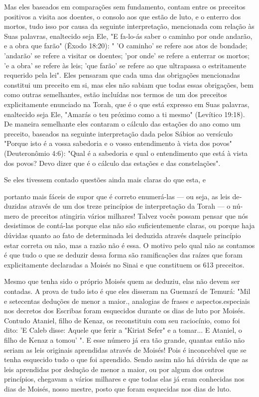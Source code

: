 \begin{itemize}
\begin{enumrate}
Mas eles baseados em comparações sem fundamento, contam entre os
preceitos positivos a visita aos doentes, o consolo aos que estão de
luto, e o enterro dos mortos, tudo isso por causa da seguinte
interpretação, mencio­nada com relação às Suas palavras, enaltecido seja
Ele, "E fa-lo-ás saber o cami­nho por onde andarão, e a obra que farão"
(Êxodo 18:20): " 'O caminho' se refere aos atos de bondade; 'andarão' se
refere a visitar os doentes; 'por onde' se refere a enterrar os mortos;
'e a obra' se refere às leis; 'que farão' se refere ao que ultrapassa o
estritamente requerido pela lei". Eles pensaram que cada uma das
obrigações mencionadas constitui um preceito em si, mas eles não sa­biam
que todas essas obrigações, bem como outras semelhantes, estão
incluí­das nos termos de um dos preceitos explicitamente enunciado na
Torah, que é o que está expresso em Suas palavras, enaltecido seja Ele,
"Amarás o teu pró­ximo como a ti mesmo" (Levítico 19:18). De maneira
semelhante eles conta­ram o cálculo das estações do ano como um
preceito, baseados na seguinte in­terpretação dada pelos Sábios ao
versículo "Porque isto é a vossa sabedoria e o vosso entendimento à
vista dos povos" (Deuteronômio 4:6): "Qual é a sabe­doria e qual o
entendimento que está à vista dos povos? Devo dizer que é o cálculo das
estações e das constelações".


Se eles tivessem contado questões ainda mais claras do que esta, e


portanto mais fáceis de supor que é correto enumerá-las --- ou seja, as
leis de­duzidas através de um dos treze princípios de interpretação da
Torah --- o nú­mero de preceitos atingiria vários milhares! Talvez vocês
possam pensar que nós desistimos de contá-las porque elas não são
suficientemente claras, ou por­que haja dúvidas quanto ao fato de
determinada lei deduzida através daquele princípio estar correta ou não,
mas a razão não é essa. O motivo pelo qual não as contamos é que tudo o
que se deduzir dessa forma são ramificações das raí­zes que foram
explicitamente declaradas a Moisés no Sinai e que constituem os 613
preceitos.

Mesmo que tenha sido o próprio Moisés quem as deduziu, elas não devem
ser contadas. A prova de tudo isto é que eles disseram na Guemará de
Temurá: "Mil e setecentas deduções de menor a maior., analogias de
frases e aspectos.especiais nos decretos dos Escribas foram esquecidos
durante os dias de luto por Moisés. Contudo Ataniel, filho de Kenaz, os
reconstituiu com seu raciocínio, como foi dito: 'E Caleb disse: Aquele
que ferir a "Kiriat Sefer" e a tomar... E Ataniel, o filho de Kenaz a
tomou' ". E esse número já era tão gran­de, quantas então não seriam as
leis originais aprendidas através de Moisés! Pois é inconcebível que se
tenha esquecido tudo o que foi aprendido. Sendo assim não há dúvida de
que as leis aprendidas por dedução de menor a maior, ou por algum dos
outros princípios, chegavam a vários milhares e que todas elas já eram
conhecidas nos dias de Moisés, nosso mestre, posto que foram esqueci­das
nos dias de luto.


\end{enumrate}
\end{itemize}

